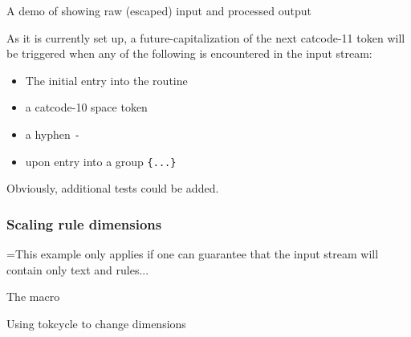 \documentclass[10pt]{article}
\def\ddbend{\setbox0=\hbox{\dbend\dbend}\leavevmode\llap{%
  \raisebox{10pt}{\box0~}}}
\newcommand\TokCycle{\textsf{tokcycle}}
\begin{document}
\begin{exampleA}[]{A demo of  showing raw (escaped)
  input and processed output}
\end{exampleA}

As it is currently set up, a future-capitalization of the next catcode-11 token will be triggered when any of the following is encountered in the input stream:
\begin{itemize}
\item    The initial entry into the routine

\item    a catcode-10 space token

\item    a hyphen \texttt{-}

\item    upon entry into a group \texttt{\{...\}}
\end{itemize}

Obviously, additional tests could be added.

\endgroup

\subsubsection{Scaling rule dimensions}
\begingroup

\ddbend This example only applies if one can guarantee that
  the input stream will contain only text and rules...

\begin{exampleC}[]{The  macro}
\newcommand\growdim[2]{%
\tokcycle{\addcytoks{##1}}
         {\addcytoks{#1\dimexpr##1}}
         {\addcytoks{##1}}
         {\addcytoks{##1}}{%
    #2}%
\the\cytoks}
\end{exampleC}

\begin{exampleA}[]{Using \TokCycle{} to change  dimensions}
\par
{}
\end{exampleA}
\end{document}

